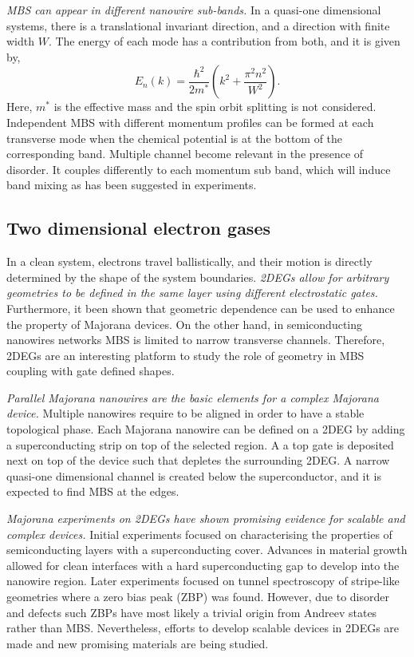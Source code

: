 \textit{MBS can appear in different nanowire sub-bands.}
In a quasi-one dimensional systems, there is a translational invariant direction, and a direction with finite width $W$.
The energy of each mode has a contribution from both, and it is given by,
\begin{equation}
E_{n}(k) = \frac{\hbar^{2}}{2m^*} \left( k^{2} + \frac{\pi^{2} n^{2}}{W^{2}} \right).
\end{equation}
Here, $m^{*}$ is the effective mass and the spin orbit splitting is not considered.
Independent MBS with different momentum profiles can be formed at each transverse mode when the chemical potential is at the bottom of the corresponding band.
Multiple channel become relevant in the presence of disorder.
It couples differently to each momentum sub band, which will induce band mixing as has been suggested in experiments.


\subsection{Two dimensional electron gases}

In a clean system, electrons travel ballistically, and their motion is directly determined by the shape of the system boundaries.
\textit{2DEGs allow for arbitrary geometries to be defined in the same layer using different electrostatic gates.}
Furthermore, it been shown that geometric dependence can be used to enhance the property of Majorana devices.
On the other hand, in semiconducting nanowires networks MBS is limited to narrow transverse channels.
Therefore, 2DEGs are an interesting platform to study the role of geometry in MBS coupling with gate defined shapes.

\textit{Parallel Majorana nanowires are the basic elements for a complex Majorana device.}
Multiple nanowires require to be aligned in order to have a stable topological phase.
Each Majorana nanowire can be defined on a 2DEG by adding a superconducting strip on top of the selected region.
A a top gate is deposited next on top of the device such that depletes the surrounding 2DEG.
A narrow quasi-one dimensional channel is created below the superconductor, and it is expected to find MBS at the edges.

\textit{Majorana experiments on 2DEGs have shown promising evidence for scalable and complex devices.}
Initial experiments\cite{Shabani2015,Kjaergaard2016} focused on characterising the properties of semiconducting layers with a superconducting cover.
Advances in material growth allowed for clean interfaces with a hard superconducting gap to develop into the nanowire region.
Later experiments focused on tunnel spectroscopy of stripe-like geometries\cite{Suominen2017} where a zero bias peak (ZBP) was found.
However, due to disorder and defects such ZBPs have most likely a trivial origin from Andreev states rather than MBS.
Nevertheless, efforts to develop scalable devices in 2DEGs are made and new promising materials are being studied.

